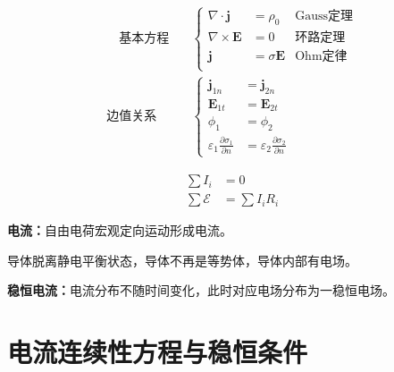 \documentclass[12pt,onecolumn,a4paper]{book}
\newenvironment{block}[1]{
    \begin{tcolorbox}[colback=blue!5!white,colframe=blue!75!black,title=#1]
}{
    \end{tcolorbox}
}
\numberwithin{table}{subsection}
\numberwithin{equation}{subsection}
\begin{document}
\begin{block}{方程}
    \begin{align}
        \quad
        \text{基本方程} \quad & \left\{
        \begin{aligned}
            \nabla \cdot \mathbf{j}  & = \rho_0            & \text{Gauss定理} \\
            \nabla \times \mathbf{E} & = 0                 & \text{环路定理}    \\
            \mathbf{j}               & = \sigma \mathbf{E} & \text{Ohm定律}   \\
        \end{aligned}
        \right.                     \\
        \text{边值关系} \quad
                          & \left\{
        \begin{aligned}
            \mathbf{j}_{1n}                                   & = \mathbf{j}_{2n}                                   \\
            \mathbf{E}_{1t}                                   & = \mathbf{E}_{2t}                                   \\
            \phi_1                                            & =   \phi_2                                          \\
            \varepsilon_1\frac{\partial \sigma_1}{\partial n} & = \varepsilon_2\frac{\partial \sigma_2}{\partial n}
        \end{aligned}
        \right.
    \end{align}
\end{block}

\begin{block}{Kirchhoff定律}
    \begin{align}
        \sum I_i         & = 0           \\
        \sum \mathcal{E} & = \sum I_iR_i
    \end{align}

\end{block}

\newpage

\textbf{电流：}自由电荷宏观定向运动形成电流。

导体脱离静电平衡状态，导体不再是等势体，导体内部有电场。

\textbf{稳恒电流：}电流分布不随时间变化，此时对应电场分布为一稳恒电场。

\section{电流连续性方程与稳恒条件}
\end{document}
